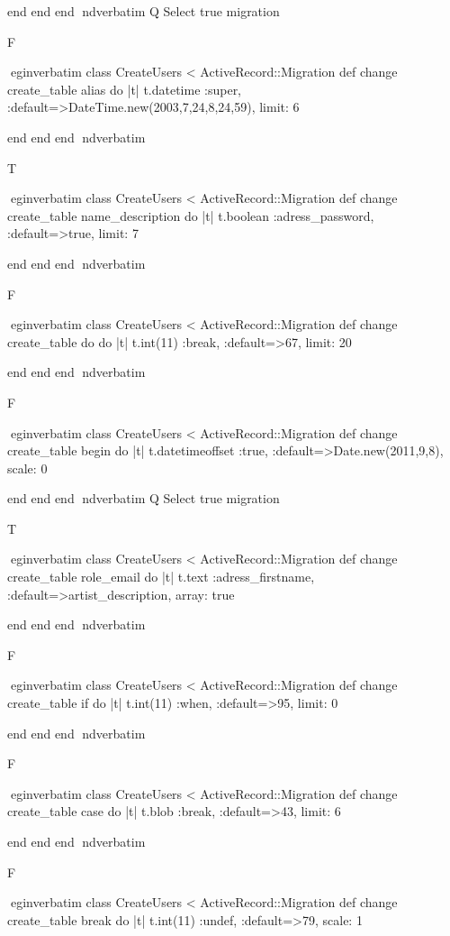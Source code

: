     end 
  end 
end
nd{verbatim}
Q
 Select true migration

F

egin{verbatim}
 class CreateUsers < ActiveRecord::Migration 
  def change 
    create_table alias do |t| 
      t.datetime :super, :default=>DateTime.new(2003,7,24,8,24,59), limit: 6
    
    end 
  end 
end
nd{verbatim}

T

egin{verbatim}
 class CreateUsers < ActiveRecord::Migration 
  def change 
    create_table name_description do |t| 
      t.boolean :adress_password, :default=>true, limit: 7
    
    end 
  end 
end
nd{verbatim}

F

egin{verbatim}
 class CreateUsers < ActiveRecord::Migration 
  def change 
    create_table do do |t| 
      t.int(11) :break, :default=>67, limit: 20
    
    end 
  end 
end
nd{verbatim}

F

egin{verbatim}
 class CreateUsers < ActiveRecord::Migration 
  def change 
    create_table begin do |t| 
      t.datetimeoffset :true, :default=>Date.new(2011,9,8), scale: 0
    
    end 
  end 
end
nd{verbatim}
Q
 Select true migration

T

egin{verbatim}
 class CreateUsers < ActiveRecord::Migration 
  def change 
    create_table role_email do |t| 
      t.text :adress_firstname, :default=>artist_description, array: true
    
    end 
  end 
end
nd{verbatim}

F

egin{verbatim}
 class CreateUsers < ActiveRecord::Migration 
  def change 
    create_table if do |t| 
      t.int(11) :when, :default=>95, limit: 0
    
    end 
  end 
end
nd{verbatim}

F

egin{verbatim}
 class CreateUsers < ActiveRecord::Migration 
  def change 
    create_table case do |t| 
      t.blob :break, :default=>43, limit: 6
    
    end 
  end 
end
nd{verbatim}

F

egin{verbatim}
 class CreateUsers < ActiveRecord::Migration 
  def change 
    create_table break do |t| 
      t.int(11) :undef, :default=>79, scale: 1
    
